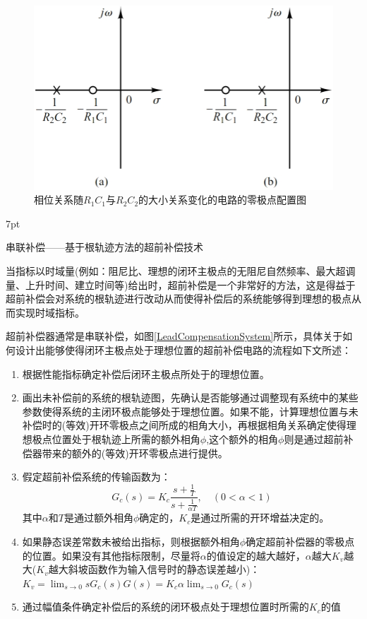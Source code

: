 \documentclass{article}
\numberwithin{equation}{section}
\numberwithin{figure}{section}
\newenvironment{formal}{%
\def\FrameCommand{%
\hspace{1pt}%
{\color{DarkBlue}\vrule width 2pt}%
{\color{formalshade}\vrule width 4pt}%
\colorbox{formalshade}%
}%
\MakeFramed{\advance\hsize-\width\FrameRestore}%
\noindent\hspace{-4.55pt}%
\begin{adjustwidth}{}{7pt}%
\vspace{2pt}\vspace{2pt}%
}
{%
\vspace{2pt}\end{adjustwidth}\endMakeFramed%
}
\begin{document}
\begin{figure}
    \centering
    \includegraphics[width=.4\textwidth]{Chapter6/configurationofpolesandzerosofleadorlagcompensator.png} %
    \caption{相位关系随$R_1C_1$与$R_2C_2$的大小关系变化的电路的零极点配置图} %
    \label{configurationofpolesandzerosofleadorlagcompensator} %
\end{figure}

\begin{formal}
    串联补偿——基于根轨迹方法的超前补偿技术
\end{formal}

当指标以时域量(例如：阻尼比、理想的闭环主极点的无阻尼自然频率、最大超调量、上升时间、建立时间等)给出时，超前补偿是一个非常好的方法，这是得益于超前补偿会对系统的根轨迹进行改动从而使得补偿后的系统能够得到理想的极点从而实现时域指标。

超前补偿器通常是串联补偿，如图\ref{LeadCompensationSystem}所示，具体关于如何设计出能够使得闭环主极点处于理想位置的超前补偿电路的流程如下文所述：
\begin{enumerate}
    \item 根据性能指标确定补偿后闭环主极点所处于的理想位置。
    \item 画出未补偿前的系统的根轨迹图，先确认是否能够通过调整现有系统中的某些参数使得系统的主闭环极点能够处于理想位置。如果不能，计算理想位置与未补偿时的(等效)开环零极点之间所成的相角大小，再根据相角关系确定使得理想极点位置处于根轨迹上所需的额外相角$\phi$,这个额外的相角$\phi$则是通过超前补偿器带来的额外的(等效)开环零极点进行提供。
    \item 假定超前补偿系统的传输函数为：
    \begin{equation}
        G_c(s)=K_c\frac{s+\frac{1}{T}}{s+\frac{1}{\alpha T}},\quad (0<\alpha<1)
    \end{equation}
    其中$\alpha$和$T$是通过额外相角$\phi$确定的，$K_c$是通过所需的开环增益决定的。
    \item 如果静态误差常数未被给出指标，则根据额外相角$\phi$确定超前补偿器的零极点的位置。如果没有其他指标限制，尽量将$\alpha$的值设定的越大越好，$\alpha$越大$K_v$越大($K_v$越大斜坡函数作为输入信号时的静态误差越小)：$K_v=\lim_{s\rightarrow 0}sG_c(s)G(s)=K_c\alpha\lim_{s\rightarrow 0}G_c(s)$
    \item 通过幅值条件确定补偿后的系统的闭环极点处于理想位置时所需的$K_c$的值
\end{enumerate}
\end{document}
